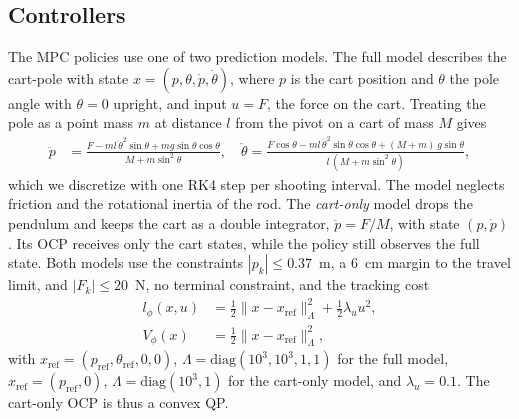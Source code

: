 \documentclass{l4dc2027}
\begin{document}
\subsection{Controllers}
\label{sec:models}
\label{sec:interfaces}

The \ac{MPC} policies use one of two prediction models. The full model
describes the cart-pole with state $x=(p,\theta,\dot p,\dot\theta)$, where $p$
is the cart position and $\theta$ the pole angle with $\theta=0$ upright, and
input $u=F$, the force on the cart. Treating the pole as a point mass $m$ at
distance $l$ from the pivot on a cart of mass $M$ gives
\begin{equation}
\begin{aligned}
  \ddot p &= \frac{F - m l\,\dot\theta^2\sin\theta
            + m g\sin\theta\cos\theta}{M + m\sin^2\theta},\quad
  \ddot\theta = \frac{F\cos\theta - m l\,\dot\theta^2\sin\theta\cos\theta
            + (M+m)\,g\sin\theta}{l\,(M + m\sin^2\theta)},
\end{aligned}
\label{eq:cartpole}
\end{equation}
which we discretize with one RK4 step per shooting interval. The model neglects
friction and the rotational inertia of the rod. The
\emph{cart-only} model drops the pendulum and keeps the cart as a double
integrator, $\ddot p = F/M$, with state $(p,\dot p)$. Its \ac{OCP} receives only
the cart states, while the policy still observes the full state. Both models
use the constraints $|p_k|\le0.37$~m, a 6~cm margin to the travel limit, and
$|F_k|\le20$~N, no terminal constraint, and the tracking cost
\begin{equation}
\begin{aligned}
  l_\phi(x,u) &= \tfrac{1}{2}\|x - x_{\mathrm{ref}}\|_{\Lambda}^2
                         + \tfrac{1}{2}\lambda_u u^2,\\
  V_\phi(x)   &= \tfrac{1}{2}\|x - x_{\mathrm{ref}}\|_{\Lambda}^2,
\end{aligned}
\label{eq:cost}
\end{equation}
with $x_{\mathrm{ref}}=(p_{\mathrm{ref}},\theta_{\mathrm{ref}},0,0)$,
$\Lambda=\mathrm{diag}(10^3,10^3,1,1)$ for the full model,
$x_{\mathrm{ref}}=(p_{\mathrm{ref}},0)$, $\Lambda=\mathrm{diag}(10^3,1)$ for the
cart-only model, and $\lambda_u=0.1$. The cart-only \ac{OCP} is thus a convex QP.
\end{document}
